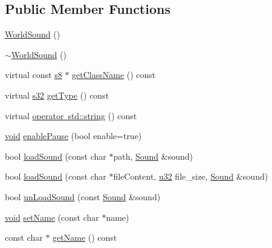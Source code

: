 \subsection*{Public Member Functions}
\begin{DoxyCompactItemize}
\item 
\mbox{\hyperlink{classnjli_1_1_world_sound_aed4012c3031f6f1b8fdf0c3f9ebc37b5}{World\+Sound}} ()
\item 
\mbox{\hyperlink{classnjli_1_1_world_sound_a2fb62ddebed62016ca546b1f496bac17}{$\sim$\+World\+Sound}} ()
\item 
virtual const \mbox{\hyperlink{_util_8h_a2ff401e087cf786c38a6812723e94473}{s8}} $\ast$ \mbox{\hyperlink{classnjli_1_1_world_sound_af737672a862c91dee7158f09ee646549}{get\+Class\+Name}} () const
\item 
virtual \mbox{\hyperlink{_util_8h_aa62c75d314a0d1f37f79c4b73b2292e2}{s32}} \mbox{\hyperlink{classnjli_1_1_world_sound_afa9fb24ca771bb477fdc673668c110c3}{get\+Type}} () const
\item 
virtual \mbox{\hyperlink{classnjli_1_1_world_sound_a13ce9a50994719130f8492017f82b887}{operator std\+::string}} () const
\item 
\mbox{\hyperlink{_thread_8h_af1e856da2e658414cb2456cb6f7ebc66}{void}} \mbox{\hyperlink{classnjli_1_1_world_sound_a48829ae6317cd2476854d36417f09b5c}{enable\+Pause}} (bool enable=true)
\item 
bool \mbox{\hyperlink{classnjli_1_1_world_sound_a97885caaa2588661c1339788d8196d89}{load\+Sound}} (const char $\ast$path, \mbox{\hyperlink{classnjli_1_1_sound}{Sound}} \&sound)
\item 
bool \mbox{\hyperlink{classnjli_1_1_world_sound_a548876efce189ddf088d503e41d6e7f6}{load\+Sound}} (const char $\ast$file\+Content, \mbox{\hyperlink{_util_8h_a10e94b422ef0c20dcdec20d31a1f5049}{u32}} file\+\_\+size, \mbox{\hyperlink{classnjli_1_1_sound}{Sound}} \&sound)
\item 
bool \mbox{\hyperlink{classnjli_1_1_world_sound_a7911347b81467da066b5f8f21767a7f7}{un\+Load\+Sound}} (const \mbox{\hyperlink{classnjli_1_1_sound}{Sound}} \&sound)
\item 
\mbox{\hyperlink{_thread_8h_af1e856da2e658414cb2456cb6f7ebc66}{void}} \mbox{\hyperlink{classnjli_1_1_world_sound_a087eb5f8d9f51cc476f12f1d10a3cb95}{set\+Name}} (const char $\ast$name)
\item 
const char $\ast$ \mbox{\hyperlink{classnjli_1_1_world_sound_ad41266885be835f3ee602311e20877a4}{get\+Name}} () const
\end{DoxyCompactItemize}
